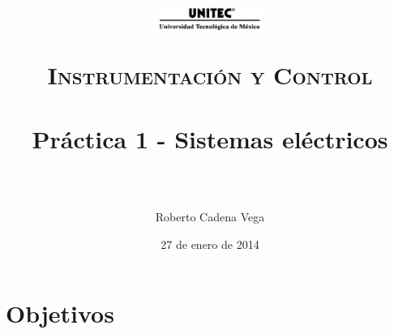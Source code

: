 



\title{	
	\normalfont \normalsize
	\begin{figure}[h]
		\begin{center}
			\includegraphics[width=0.3\textwidth]{UNITEC.png} %
		\end{center}
	\end{figure}
	\textsc{Instrumentación y Control} \\ [25pt]
	\horrule{0.5pt} \\[0.4cm] %
	\huge Práctica 1 - Sistemas eléctricos \\ %
	\horrule{2pt} \\[0.5cm] %
}

\author{Roberto Cadena Vega} %

\date{\normalsize 27 de enero de 2014} %




\maketitle %


\section{Objetivos}

